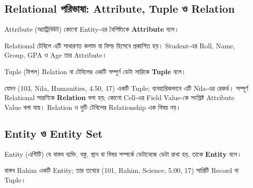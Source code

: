 \begin{flushleft}
\end{flushleft}

\subsection{Relational পরিভাষা: Attribute, Tuple ও Relation}
\begin{definitionbox}{Attribute (অ্যাট্রিবিউট)}
কোনো Entity-এর বৈশিষ্ট্যকে \textbf{Attribute} বলে।
\end{definitionbox}
Relational টেবিলে এটি সাধারণত কলাম বা ফিল্ড হিসেবে প্রকাশিত হয়। Student-এর Roll, Name, Group, GPA ও Age তার Attribute।

\begin{definitionbox}{Tuple (টাপল)}
Relation বা টেবিলের একটি সম্পূর্ণ ডেটা সারিকে \textbf{Tuple} বলে।
\end{definitionbox}
যেমন (103, Nila, Humanities, 4.50, 17) একটি Tuple; ব্যবহারিকভাবে এটি Nila-এর রেকর্ড। সম্পূর্ণ Relational সারণিকে \textbf{Relation} বলা হয়; কোনো Cell-এর Field Value-কে সংশ্লিষ্ট Attribute Value বলা যায়। Relation ও দুটি টেবিলের Relationship এক বিষয় নয়।

\subsection{Entity ও Entity Set}
\begin{definitionbox}{Entity (এন্টিটি)}
যে বাস্তব ব্যক্তি, বস্তু, স্থান বা বিষয় সম্পর্কে ডেটাবেজে ডেটা রাখা হয়, তাকে \textbf{Entity} বলে।
\end{definitionbox}
বাস্তব Rahim একটি Entity; তার তথ্যের (101, Rahim, Science, 5.00, 17) সারিটি Record বা Tuple।

